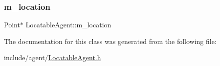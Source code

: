 \subsubsection{\texorpdfstring{m\+\_\+location}{m\_location}}
{\footnotesize\ttfamily Point$\ast$ Locatable\+Agent\+::m\+\_\+location\hspace{0.3cm}{\ttfamily [private]}}



The documentation for this class was generated from the following file\+:\begin{DoxyCompactItemize}
\item 
include/agent/\hyperlink{_locatable_agent_8h}{Locatable\+Agent.\+h}\end{DoxyCompactItemize}
